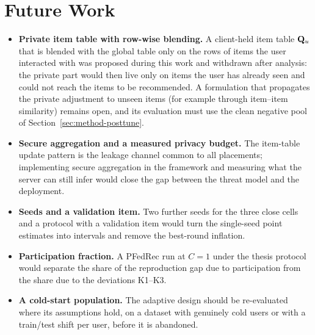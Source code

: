 \section{Future Work}
\label{sec:conc-future}

\begin{itemize}[leftmargin=2em]
  \item \textbf{Private item table with row-wise blending.} A client-held item table
        $\mathbf{Q}_u$ that is blended with the global table only on the rows of items the user
        interacted with was proposed during this work and withdrawn after analysis: the private
        part would then live only on items the user has already seen and could not reach the
        items to be recommended. A formulation that propagates the private adjustment to
        unseen items (for example through item--item similarity) remains open, and its
        evaluation must use the clean negative pool of Section~\ref{sec:method-posttune}.
  \item \textbf{Secure aggregation and a measured privacy budget.} The item-table update
        pattern is the leakage channel common to all placements; implementing secure
        aggregation \cite{bonawitz2017secagg} in the framework and measuring what the server
        can still infer would close the gap between the threat model and the deployment.
  \item \textbf{Seeds and a validation item.} Two further seeds for the three close cells and a
        protocol with a validation item would turn the single-seed point estimates into
        intervals and remove the best-round inflation.
  \item \textbf{Participation fraction.} A PFedRec run at $C=1$ under the thesis protocol
        would separate the share of the reproduction gap due to participation from the share
        due to the deviations K1--K3.
  \item \textbf{A cold-start population.} The adaptive design should be re-evaluated where its
        assumptions hold, on a dataset with genuinely cold users or with a train/test shift per
        user, before it is abandoned.
\end{itemize}
